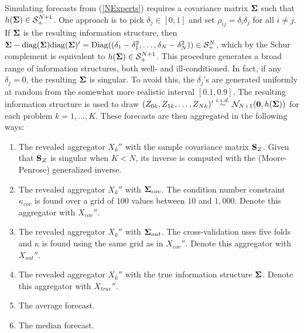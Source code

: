 \documentclass[11pt]{article}
\newtheorem{proposition}[theorem]{Proposition}
\theoremstyle{definition}
\theoremstyle{definition}
\def\bSigma{{\bf \Sigma}}
\def\X{{\bf X}}
\def\Z{{\bf Z}}
\def\SS{{\bf S}}
\def\diag{\text{diag}}
\def\Diag{\text{Diag}}
\def\diag{\text{diag}}
\begin{document}
Simulating forecasts from (\ref{NExperts}) requires a covariance matrix $\bSigma$ such that $h(\bSigma) \in \mathcal{S}_{+}^{N+1}$. 
One approach is to pick $\delta_j \in [0,1]$ and set $\rho_{ij} = \delta_i \delta_j$ for all $i \neq j$. If  $\bSigma$ is the resulting information structure, then $\bSigma - \diag(\bSigma)\diag(\bSigma)' = \Diag((\delta_1 - \delta_1^2, \dots, \delta_N - \delta_N^2)) \in \mathcal{S}_{+}^{N}$, which by the Schur complement is equivalent to $h(\bSigma) \in \mathcal{S}_{+}^{N+1}$. 
This procedure generates a broad range of information structures, both well- and ill-conditioned. In fact, if any $\delta_j = 0$, the resulting $\bSigma$ is singular.  To avoid this, the $\delta_j$'s are generated uniformly at random from the somewhat more realistic interval $[0.1, 0.9]$. The resulting information structure is used to draw $(Z_{0k}, Z_{1k}, \dots, Z_{Nk})' \stackrel{i.i.d.}{\sim} \mathcal{N}_{N+1}(\boldsymbol{0}, h(\bSigma))$ for each problem $k = 1, \dots, K$. These forecasts are then aggregated in the following ways:
\begin{enumerate}
\item  The revealed aggregator  $X_k''$ with the sample covariance matrix $\SS_Z$. Given that $\SS_Z$ is singular when $K<N$, its inverse is computed with the (Moore-Penrose) generalized inverse.
\item The revealed aggregator $X_k''$ with $\bSigma_{cov}$. The condition number constraint $\kappa_{cov}$ is found over a grid of $100$ values between $10$ and $1,000$. Denote this aggregator with $X_{cov}''$. 
\item The revealed aggregator  $X_k''$ with $\bSigma_{out}$.  
The cross-validation uses five folds and $\kappa$ is found using the same grid as in $X_{cov}''$. Denote this aggregator with  $X_{out}''$. 
\item  The revealed aggregator  $X_k''$ with the true information structure $\bSigma$. Denote this aggregator with $X_{true}''$. 
\item The average forecast.
\item The median forecast.
\end{enumerate}
\end{document}
